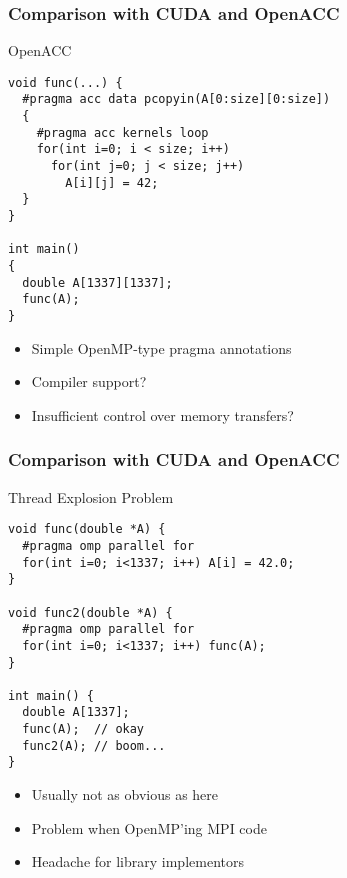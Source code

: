 \begin{frame}[fragile]
\frametitle{Comparison with CUDA and OpenACC}
 \begin{block}{OpenACC}
  \begin{lstlisting}
void func(...) {
  #pragma acc data pcopyin(A[0:size][0:size])
  {
    #pragma acc kernels loop
    for(int i=0; i < size; i++)
      for(int j=0; j < size; j++)
        A[i][j] = 42;
  }
}

int main()
{
  double A[1337][1337];
  func(A);
}
  \end{lstlisting}

  \begin{itemize}
   \item Simple OpenMP-type pragma annotations
   \item Compiler support?
   \item Insufficient control over memory transfers?
  \end{itemize}
 \end{block}

\end{frame}




\begin{frame}[fragile]
\frametitle{Comparison with CUDA and OpenACC}
 \begin{block}{Thread Explosion Problem}
  \begin{lstlisting}
void func(double *A) {
  #pragma omp parallel for
  for(int i=0; i<1337; i++) A[i] = 42.0;
}

void func2(double *A) {
  #pragma omp parallel for
  for(int i=0; i<1337; i++) func(A);
}

int main() {
  double A[1337];
  func(A);  // okay
  func2(A); // boom...
}
  \end{lstlisting}

  \begin{itemize}
   \item Usually not as obvious as here
   \item Problem when OpenMP'ing MPI code
   \item Headache for library implementors
  \end{itemize}
 \end{block}

\end{frame}

